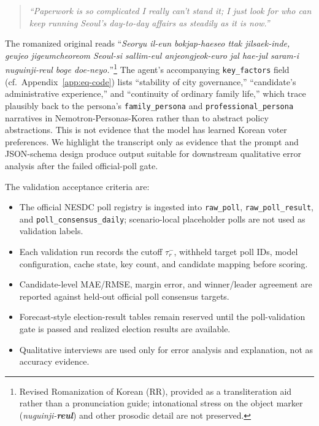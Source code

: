 \documentclass[11pt]{article}
\begin{document}
\begin{quote}
\itshape
``Paperwork is so complicated I really can't stand it; I just look for who can keep running Seoul's day-to-day affairs as steadily as it is now.''
\end{quote}

\noindent The romanized original reads ``\textit{Seoryu il-eun bokjap-haeseo ttak jilsaek-inde, geujeo jigeumcheoreom Seoul-si sallim-eul anjeongjeok-euro jal hae-jul saram-i nuguinji-reul boge doe-neyo.}''\footnote{Revised Romanization of Korean (RR), provided as a transliteration aid rather than a pronunciation guide; intonational stress on the object marker (\textit{nuguinji-\textbf{reul}}) and other prosodic detail are not preserved.} The agent's accompanying \texttt{key\_factors} field (cf.\ Appendix~\ref{app:eq-code}) lists ``stability of city governance,'' ``candidate's administrative experience,'' and ``continuity of ordinary family life,'' which trace plausibly back to the persona's \texttt{family\_persona} and \texttt{professional\_persona} narratives in Nemotron-Personas-Korea rather than to abstract policy abstractions. This is not evidence that the model has learned Korean voter preferences. We highlight the transcript only as evidence that the prompt and JSON-schema design produce output suitable for downstream qualitative error analysis after the failed official-poll gate.

The validation acceptance criteria are:

\begin{itemize}
  \item The official NESDC poll registry is ingested into \texttt{raw\_poll}, \texttt{raw\_poll\_result}, and \texttt{poll\_consensus\_daily}; scenario-local placeholder polls are not used as validation labels.
  \item Each validation run records the cutoff $\tau_r^-$, withheld target poll IDs, model configuration, cache state, key count, and candidate mapping before scoring.
  \item Candidate-level MAE/RMSE, margin error, and winner/leader agreement are reported against held-out official poll consensus targets.
  \item Forecast-style election-result tables remain reserved until the poll-validation gate is passed and realized election results are available.
  \item Qualitative interviews are used only for error analysis and explanation, not as accuracy evidence.
\end{itemize}
\end{document}
